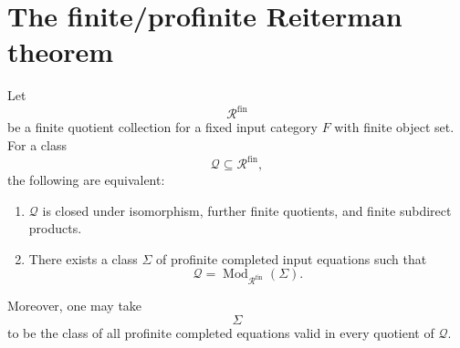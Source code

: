 \section{The finite/profinite Reiterman theorem}
\label{sec:reiterman-finite-profinite-theorem}

\begin{theorem}
\label{thm:reiterman-finite-profinite}
Let
\[
\mathcal R^{\mathrm{fin}}
\]
be a finite quotient collection for a fixed input category \(F\) with finite
object set. For a class
\[
\mathcal Q\subseteq\mathcal R^{\mathrm{fin}},
\]
the following are equivalent:
\begin{enumerate}
\item \(\mathcal Q\) is closed under isomorphism, further finite quotients,
and finite subdirect products.
\item There exists a class \(\Sigma\) of profinite completed input equations
such that
\[
\mathcal Q=\operatorname{Mod}_{\mathcal R^{\mathrm{fin}}}(\Sigma).
\]
\end{enumerate}
Moreover, one may take
\[
\Sigma
\]
to be the class of all profinite completed equations valid in every quotient
of \(\mathcal Q\).
\end{theorem}

